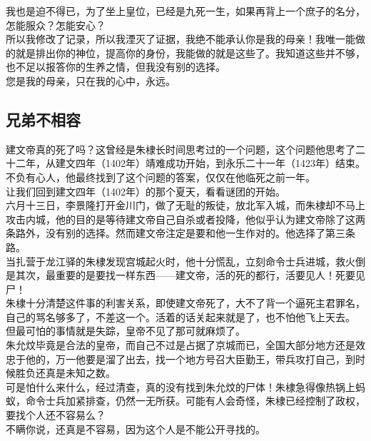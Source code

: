 \begin{multicols}{\theparacolNo}
我也是迫不得已，为了坐上皇位，已经是九死一生，如果再背上一个庶子的名分，怎能服众？怎能安心？\\

所以我修改了记录，所以我湮灭了证据，我绝不能承认你是我的母亲！我唯一能做的就是排出你的神位，提高你的身份，我能做的就是这些了。我知道这些并不够，也不足以报答你的生养之情，但我没有别的选择。\\

您是我的母亲，只在我的心中，永远。\\

\subsection{兄弟不相容}
建文帝真的死了吗？这曾经是朱棣长时间思考过的一个问题，这个问题他思考了二十二年，从建文四年（1402年）靖难成功开始，到永乐二十一年（1423年）结束。不负有心人，他最终找到了这个问题的答案，仅仅在他临死之前一年。\\

让我们回到建文四年（1402年）的那个夏天，看看谜团的开始。\\

六月十三日，李景隆打开金川门，做了无耻的叛徒，放北军入城，而朱棣却不马上攻击内城，他的目的是等待建文帝自己自杀或者投降，他似乎认为建文帝除了这两条路外，没有别的选择。然而建文帝注定是要和他一生作对的。他选择了第三条路。\\

当扎营于龙江驿的朱棣发现宫城起火时，他十分慌乱，立刻命令士兵进城，救火倒是其次，最重要的是要找一样东西——建文帝，活的死的都行，活要见人！死要见尸！\\

朱棣十分清楚这件事的利害关系，即使建文帝死了，大不了背一个逼死主君罪名，自己的骂名够多了，不差这一个。活着的话关起来就是了，也不怕他飞上天去。\\

但最可怕的事情就是失踪，皇帝不见了那可就麻烦了。\\

朱允炆毕竟是合法的皇帝，而自己不过是占据了京城而已，全国大部分地方还是效忠于他的，万一他要是溜了出去，找一个地方号召大臣勤王，带兵攻打自己，到时候胜负还真是未知之数。\\

可是怕什么来什么，经过清查，真的没有找到朱允炆的尸体！朱棣急得像热锅上蚂蚁，命令士兵加紧排查，仍然一无所获。可能有人会奇怪，朱棣已经控制了政权，要找个人还不容易么？\\

不瞒你说，还真是不容易，因为这个人是不能公开寻找的。\\


\end{multicols}
